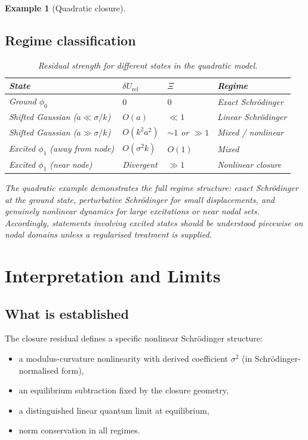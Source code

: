\documentclass[12pt]{article}
\newtheorem{example}[theorem]{Example}
\newcommand{\dUrel}{\delta U_{\mathrm{rel}}}
\begin{document}
\begin{example}[Quadratic closure]
\subsection*{Regime classification}

\begin{table}[ht]
\centering
\caption{Residual strength for different states in the quadratic model.}
\label{tab:states}
\begin{tabular}{@{}llll@{}}
\toprule
State & $\dUrel$ & $\Xi$ & Regime \\
\midrule
Ground $\phi_0$ & $0$ & $0$ & Exact Schr\"odinger \\
Shifted Gaussian ($a \ll \sigma/k$) & $O(a)$ & $\ll 1$ & Linear Schr\"odinger \\
Shifted Gaussian ($a \gg \sigma/k$) & $O(k^2 a^2)$ & $\sim 1$ or $\gg 1$ & Mixed / nonlinear \\
Excited $\phi_1$ (away from node) & $O(\sigma^2 k)$ & $O(1)$ & Mixed \\
Excited $\phi_1$ (near node) & Divergent & $\gg 1$ & Nonlinear closure \\
\bottomrule
\end{tabular}
\end{table}

The quadratic example demonstrates the full regime structure: exact Schr\"odinger at the ground state, perturbative Schr\"odinger for small displacements, and genuinely nonlinear dynamics for large excitations or near nodal sets. Accordingly, statements involving excited states should be understood piecewise on nodal domains unless a regularised treatment is supplied.
\end{example}

\section{Interpretation and Limits}\label{sec:interpretation}

\subsection*{What is established}

The closure residual defines a specific nonlinear Schr\"odinger structure:
\begin{itemize}
    \item a modulus-curvature nonlinearity with derived coefficient $\sigma^2$ (in Schr\"odinger-normalised form),
    \item an equilibrium subtraction fixed by the closure geometry,
    \item a distinguished linear quantum limit at equilibrium,
    \item norm conservation in all regimes.
\end{itemize}
\end{document}
